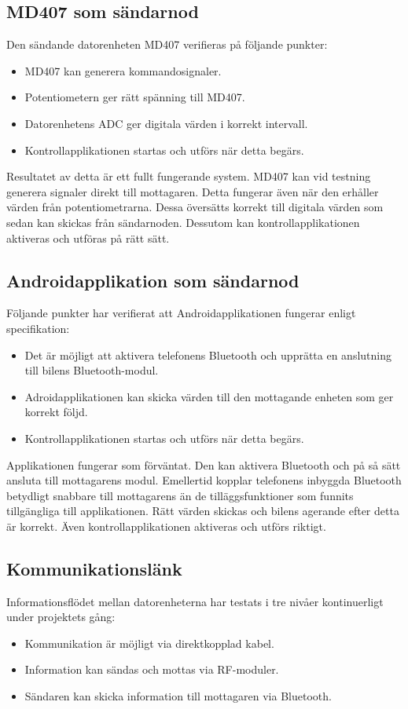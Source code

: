 \documentclass[a4paper]{article}
\begin{document}
\subsection{MD407 som sändarnod}
Den sändande datorenheten MD407 verifieras på följande punkter:
\begin{itemize}
\item MD407 kan generera kommandosignaler.
\item Potentiometern ger rätt spänning till MD407.
\item Datorenhetens ADC ger digitala värden i korrekt intervall.
\item Kontrollapplikationen startas och utförs när detta begärs.
\end{itemize}

\noindent
Resultatet av detta är ett fullt fungerande system. MD407 kan vid testning generera signaler direkt till mottagaren. Detta fungerar även när den erhåller värden från potentiometrarna. Dessa översätts korrekt till digitala värden som sedan kan skickas från sändarnoden. Dessutom kan kontrollapplikationen aktiveras och utföras på rätt sätt.


\subsection{Androidapplikation som sändarnod}
Följande punkter har verifierat att Androidapplikationen fungerar enligt specifikation:

\begin{itemize}
\item Det är möjligt att aktivera telefonens Bluetooth och upprätta en anslutning till bilens Bluetooth-modul.
\item Adroidapplikationen kan skicka värden till den mottagande enheten som ger korrekt följd.
\item Kontrollapplikationen startas och utförs när detta begärs.
\end{itemize}

\noindent
Applikationen fungerar som förväntat. Den kan aktivera Bluetooth och på så sätt ansluta till mottagarens modul. Emellertid kopplar telefonens inbyggda Bluetooth betydligt snabbare till mottagarens än de tilläggsfunktioner som funnits tillgängliga till applikationen. Rätt värden skickas och bilens agerande efter detta är korrekt. Även kontrollapplikationen aktiveras och utförs riktigt.

\newpage
\subsection{Kommunikationslänk}
Informationsflödet mellan datorenheterna har testats i tre nivåer kontinuerligt under projektets gång:
\begin{itemize}
\item Kommunikation är möjligt via direktkopplad kabel.
\item Information kan sändas och mottas via RF-moduler.
\item Sändaren kan skicka information till mottagaren via Bluetooth.
\end{itemize}
\end{document}
